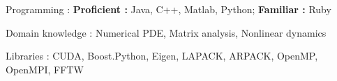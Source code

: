


\begin{cvskills}


\cvskill
	{Programming : } 
	{\textbf{Proficient :}  Java, C++, Matlab, Python;
	\textbf{Familiar :} Ruby} 

\cvskill
	{Domain knowledge : }
	{Numerical PDE, Matrix analysis, Nonlinear dynamics}


\cvskill
{Libraries : }
{CUDA, Boost.Python, Eigen, LAPACK, ARPACK, OpenMP, OpenMPI, FFTW}


\end{cvskills}
